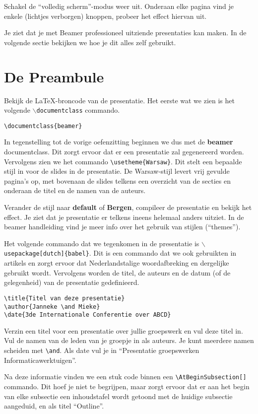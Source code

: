 \documentclass[a4paper,12pt]{article}
\newcommand{\bs}{$\backslash$}
\begin{document}
Schakel de ``volledig scherm''-modus weer uit. Onderaan elke pagina vind
je enkele (lichtjes verborgen) knoppen, probeer het effect hiervan
uit.

Je ziet dat je met Beamer professioneel uitziende presentaties kan
maken. In de volgende sectie bekijken we hoe je dit alles zelf
gebruikt.

\section{De Preambule}
Bekijk de \LaTeX{}-broncode van de presentatie. Het eerste wat we zien
is het volgende \texttt{\bs{}documentclass} commando.
\begin{verbatim}
\documentclass{beamer}
\end{verbatim}

In tegenstelling tot de vorige oefenzitting beginnen we dus met de
\textbf{beamer} documentclass. Dit zorgt ervoor dat er een presentatie
zal gegenereerd worden. Vervolgens zien we het commando
\verb~\usetheme{Warsaw}~. Dit stelt een bepaalde stijl in voor de
slides in de presentatie. De Warsaw-stijl levert vrij gevulde pagina's
op, met bovenaan de slides telkens een overzicht van de secties en
onderaan de titel en de namen van de auteurs.

Verander de stijl naar \textbf{default} of \textbf{Bergen}, compileer
de presentatie en bekijk het effect. Je ziet dat je presentatie er
telkens ineens helemaal anders uitziet. In de beamer handleiding vind je
meer info over het gebruik van stijlen (``themes'').

Het volgende commando dat we tegenkomen in de presentatie is
\texttt{\bs{}usepackage[dutch]\allowbreak{}\{babel\}}. Dit is een commando dat we ook
gebruikten in artikels en zorgt ervoor dat Nederlandstalige
woordafbreking en dergelijke gebruikt wordt. Vervolgens worden de
titel, de auteurs en de datum (of de gelegenheid) van de presentatie
gedefinieerd.
\begin{verbatim}
\title{Titel van deze presentatie}
\author{Janneke \and Mieke}
\date{3de Internationale Conferentie over ABCD}
\end{verbatim}

Verzin een titel voor een presentatie over jullie groepswerk en vul
deze titel in. Vul de namen van de leden van je groepje in als auteurs. Je kunt
meerdere namen scheiden met \texttt{\textbackslash and}. Als date vul je in ``Presentatie
groepswerken Informaticawerktuigen''.

Na deze informatie vinden we een stuk code binnen een
\verb~\AtBeginSubsection[]~ commando. Dit hoef je niet te begrijpen,
maar zorgt ervoor dat er aan het begin van elke subsectie een
inhoudstafel wordt getoond met de huidige subsectie aangeduid, en als
titel ``Outline''.
\end{document}
